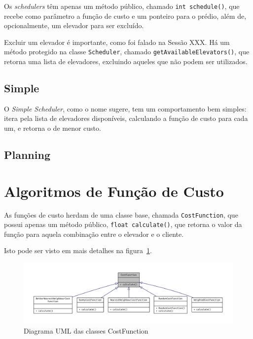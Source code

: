Os \textit{schedulers} têm apenas um método público, chamado \texttt{int
  schedule()}, que recebe como parâmetro a função de custo e um ponteiro para o
prédio, além de, opcionalmente, um elevador para ser excluído.

Excluir um elevador é importante, como foi falado na Sessão XXX. Há um método
protegido na classe \texttt{Scheduler}, chamado
\texttt{getAvailableElevators()}, que retorna uma lista de elevadores, excluindo
aqueles que não podem ser utilizados.

\subsection{\label{model:schedulers:simple}Simple}
O \textit{Simple Scheduler}, como o nome sugere, tem um comportamento bem
simples: itera pela lista de elevadores disponíveis, calculando a função de
custo para cada um, e retorna o de menor custo.

\subsection{\label{model:schedulers:planning}Planning}
\lipsum[5]

\section{\label{model:costfunctions}Algoritmos de Função de Custo}
As funções de custo herdam de uma classe base, chamada \texttt{CostFunction},
que possui apenas um método público, \texttt{float calculate()}, que retorna o
valor da função para aquela combinação entre o elevador e o cliente.

Isto pode ser visto em mais detalhes na figura~\ref{fig:model:costfunction:uml:base}.

\begin{figure}[htb]
  \centering
  \includegraphics[scale=0.8]{doc/latex/class_cost_function__inherit__graph}
  \caption{Diagrama UML das classes CostFunction}
  \label{fig:model:costfunction:uml:base}
\end{figure}

